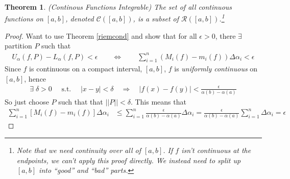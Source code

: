 \documentclass[12pt]{article}
\numberwithin{equation}{section} %
\theoremstyle{plain}
\newtheorem{thm}{Theorem}[section]
\theoremstyle{definition}
\theoremstyle{remark}
\newcommand{\sC}{\mathscr{C}}
\begin{document}
\begin{thm}\emph{(Continous Functions Integrable)}
\label{contthm}
The set of all continuous functions on $[a,b]$, denoted $\sC([a,b])$, is
a subset of $\mathscr{R}([a,b])$.\footnote{%
  Note that we need continuity over \emph{all} of $[a,b]$. If $f$ isn't
  continuous at the endpoints, we can't apply this proof directly. We
  instead need to split up $[a,b]$ into ``good'' and ``bad'' parts.
}
\end{thm}
\begin{proof}
Want to use Theorem \ref{riemcond} and show that for all
$\epsilon>0$, there $\exists$ partition $P$ such that
\begin{align*}
    U_\alpha(f,P) - L_\alpha(f,P) < \epsilon
    \qquad\iff\qquad
    \sum^n_{i=1} (M_i(f) - m_i(f)) \Delta\alpha_i < \epsilon
\end{align*}
Since $f$ is continuous on a compact interval, $[a,b]$, $f$ is
\emph{uniformly continuous} on $[a,b]$,
hence
\begin{align*}
  \exists \; \delta >0 \quad \text{ s.t. } \quad
      |x - y| < \delta \quad \Rightarrow \quad
      |f(x) - f(y)| < \frac{\epsilon}{\alpha(b)-\alpha(a)}
\end{align*}
So just choose $P$ such that that $||P|| < \delta$.  This means that
\begin{align*}
    \sum^n_{i=1} [M_i(f) - m_i(f)] \Delta\alpha_i &\leq
    \sum^n_{i=1} \frac{\epsilon}{\alpha(b)-\alpha(a)}
        \Delta\alpha_i
    =\frac{\epsilon}{\alpha(b)-\alpha(a)}\sum^n_{i=1}
        \Delta\alpha_i
    = \epsilon
\end{align*}
\end{proof}
\end{document}
